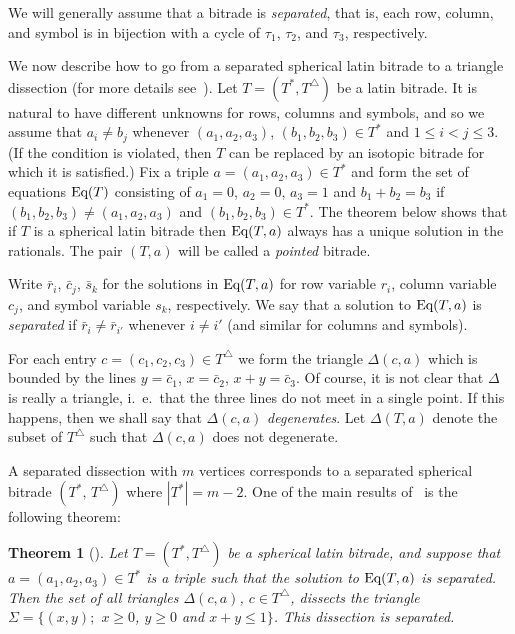 \documentclass[12pt,amstags,fleqn]{article}
\theoremstyle{plain}
\newtheorem{theorem}{Theorem}[section]
\theoremstyle{definition}
\def\ll{{\textstyle \ast}}
\def\rr{{\scriptscriptstyle \triangle}}
\newcommand{\opa}{\ll}
\newcommand{\opb}{\rr}
\newcommand{\eq}{\textnormal{Eq}}
\begin{document}
We will generally assume that a bitrade is {\em separated}, that is,
each row, column, and symbol is in bijection with a cycle of $\tau_1$,
$\tau_2$, and $\tau_3$, respectively.

We now describe how to go from a separated spherical latin bitrade to a
triangle dissection (for more details see~\cite{alesdissections}).  
Let $T= (T^\ll, T^\rr)$ be a latin bitrade. It is natural to have
different unknowns for rows, columns and symbols, and so we assume
that $a_i \ne b_j$ whenever $(a_1,a_2,a_3)$, $(b_1,b_2,b_3) \in T^\ll$
and $1 \le i < j \le 3$.  (If the condition is violated,  then $T$
can be replaced by an isotopic bitrade for which it is satisfied.)
Fix a triple $a = (a_1,a_2,a_3) \in T^\ll$ and form the set of equations
$\eq(T)$ consisting of
$a_1=0$, $a_2=0$, $a_3 =1$
and 
$b_1+b_2 = b_3$  if $(b_1,b_2,b_3) \neq (a_1,a_2,a_3)$
and $(b_1,b_2,b_3) \in T^\ll$.
The theorem below shows that if $T$ is a spherical latin
bitrade then $\eq(T, a)$ always has a unique solution in the rationals.
The pair $(T,a)$ will be called a \emph{pointed} bitrade.

Write
$\bar r_i$,
$\bar c_j$,
$\bar s_k$
for the solutions in $\eq(T, a)$ for row variable $r_i$, column variable
$c_j$, and symbol variable $s_k$, respectively. We say that 
a solution to $\eq(T, a)$ is {\em separated} if 
$\bar r_i \neq \bar r_{i'}$ whenever $i \neq i'$ (and similar for
columns and symbols).

For each entry $c = (c_1,c_2,c_3) \in T^\rr$ we form the triangle
$\Delta(c,a)$ which is bounded by the lines
$y = \bar c_1$,
$x = \bar c_2$,
$x + y = \bar c_3$.
Of course, it is not clear that $\Delta$ is really
a triangle, i.~e.~that the three lines do not meet in a single
point. If this happens, then we shall say that $\Delta(c,a)$ {\em degenerates}.
Let $\Delta(T,a)$ denote the subset of $T^\rr$ such that
$\Delta(c,a)$ does not degenerate.

A separated dissection 
with $m$ vertices corresponds to a separated spherical bitrade
$(T^{\opa},\, T^{\opb})$ where $\left| T^{\opa} \right| = m-2$.  
One of the main results of~\cite{alesdissections} is the following
theorem:

\begin{theorem}[\cite{alesdissections}]\label{sepdissections}
Let $T=(T^\ll, T^\rr)$ be a spherical latin bitrade,
and suppose that $a=(a_1,a_2,a_3) \in T^\ll$ is a triple such
that the solution to $\eq(T,a)$ is separated. Then the set
of all triangles $\Delta(c,a)$, $c \in T^\rr$, dissects the triangle
$\Sigma = \{(x,y);$ $x\ge 0$, $y\ge 0$ and $x+y \le 1\}$. This
dissection is separated.
\end{theorem}
\end{document}
